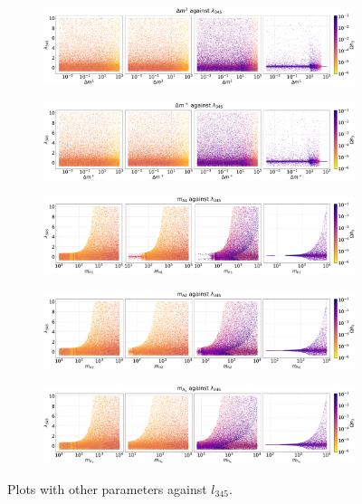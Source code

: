 \documentclass[12pt]{article}
\begin{document}
\begin{figure}[H]
    \begin{subfigure}[b]{\columnwidth}
      \centering
      \includegraphics[width=1\columnwidth]{4plot/DM2_l345.pdf}
    \end{subfigure}
    
    \begin{subfigure}[b]{\columnwidth}
      \centering
      \includegraphics[width=1\columnwidth]{4plot/DMP_l345.pdf}
    \end{subfigure}
    
    \begin{subfigure}[b]{\columnwidth}
      \centering
      \includegraphics[width=1\columnwidth]{4plot/MD1_l345.pdf}
    \end{subfigure}   
    
    \begin{subfigure}[b]{\columnwidth}
      \centering
      \includegraphics[width=1\columnwidth]{4plot/MD2_l345.pdf}
    \end{subfigure}

    \begin{subfigure}[b]{\columnwidth}
      \centering
      \includegraphics[width=1\columnwidth]{4plot/MDP_l345.pdf}
    \end{subfigure}
\caption{Plots with other parameters against $l_{345}$.}
\end{figure}
\end{document}
